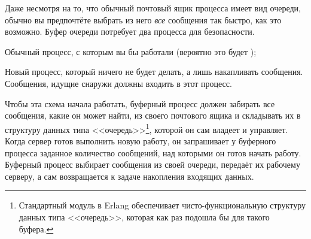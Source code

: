 \documentclass[11pt, oneside]{book}   	%
\begin{document}
Даже несмотря на то, что обычный почтовый ящик процесса имеет вид очереди, обычно вы предпочтёте выбрать из него \emph{все} сообщения так быстро, как это возможно. Буфер очереди потребует два процесса для безопасности.

\begin{itemize*}
	\item Обычный процесс, с которым вы бы работали (вероятно это будет );
	\item Новый процесс, который ничего не будет делать, а лишь накапливать сообщения. Сообщения, идущие снаружи должны входить в этот процесс.
\end{itemize*}

Чтобы эта схема начала работать, буферный процесс должен забирать все сообщения, какие он может найти, из своего почтового ящика и складывать их в структуру данных типа <<очередь>>\footnote{Стандартный модуль  в Erlang обеспечивает чисто-функциональную структуру данных типа <<очередь>>, которая как раз подошла бы для такого буфера.}, которой он сам владеет и управляет. Когда сервер готов выполнить новую работу, он запрашивает у буферного процесса заданное количество сообщений, над которыми он готов начать работу. Буферный процесс выбирает сообщения из своей очереди, передаёт их рабочему серверу, а сам возвращается к задаче накопления входящих данных.
\end{document}
